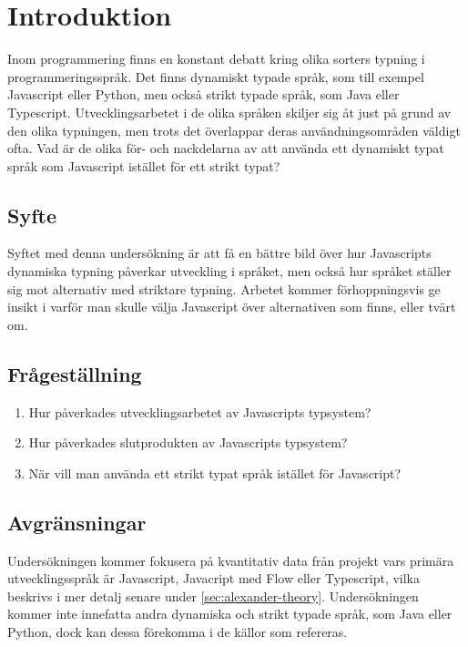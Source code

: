 \section{Introduktion}
\label{sec:alexander-introduction}
Inom programmering finns en konstant debatt kring olika sorters typning i programmeringsspråk. Det finns dynamiskt typade språk, som till exempel Javascript eller Python, men också strikt typade språk, som Java eller Typescript. Utvecklingsarbetet i de olika språken skiljer sig åt just på grund av den olika typningen, men trots det överlappar deras användningsområden väldigt ofta. Vad är de olika för- och nackdelarna av att använda ett dynamiskt typat språk som Javascript istället för ett strikt typat?

\subsection{Syfte}
\label{subsec:motivation}

Syftet med denna undersökning är att få en bättre bild över hur Javascripts dynamiska typning påverkar utveckling i språket, men också hur språket ställer sig mot alternativ med striktare typning. Arbetet kommer förhoppningsvis ge insikt i varför man skulle välja Javascript över alternativen som finns, eller tvärt om.

\subsection{Frågeställning}
\label{subsec:research-questions}

\begin{enumerate}
\item\label{alexander-fs:1} Hur påverkades utvecklingsarbetet av Javascripts typsystem?

\item\label{alexander-fs:2} Hur påverkades slutprodukten av Javascripts typsystem?

\item\label{alexander-fs:3} När vill man använda ett strikt typat språk istället för Javascript?

\end{enumerate}


\subsection{Avgränsningar}
\label{subsec:delimitations}

Undersökningen kommer fokusera på kvantitativ data från projekt vars primära utvecklingsspråk är Javascript, Javacript med Flow eller Typescript, vilka beskrivs i mer detalj senare under \ref{sec:alexander-theory}. Undersökningen kommer inte innefatta andra dynamiska och strikt typade språk, som Java eller Python, dock kan dessa förekomma i de källor som refereras.




